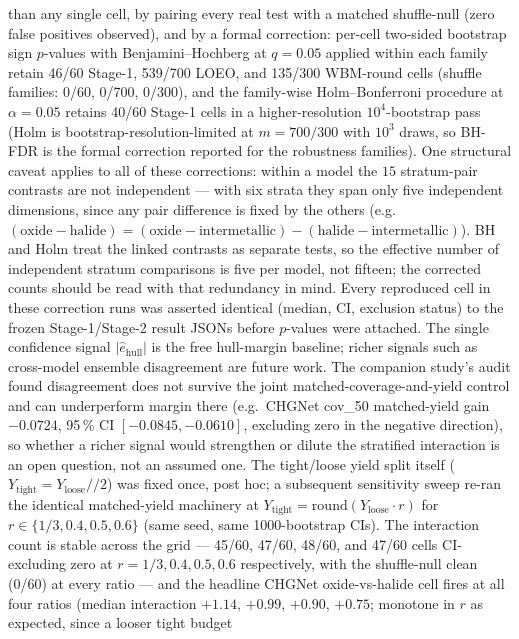 \documentclass[11pt]{article}
\begin{document}
than any single cell, by pairing every real test with a matched shuffle-null (zero false
positives observed), and by a formal correction: per-cell two-sided bootstrap sign
$p$-values with Benjamini--Hochberg at $q = 0.05$ applied within each family retain 46/60
Stage-1, 539/700 LOEO, and 135/300 WBM-round cells (shuffle families: 0/60, 0/700, 0/300),
and the family-wise Holm--Bonferroni procedure at $\alpha = 0.05$ retains 40/60 Stage-1
cells in a higher-resolution $10^4$-bootstrap pass (Holm is bootstrap-resolution-limited at
$m = 700/300$ with $10^3$ draws, so BH-FDR is the formal correction reported for the
robustness families). One structural caveat applies to all of these corrections: within a model
the $15$ stratum-pair contrasts are not independent --- with six strata they span only
five independent dimensions, since any pair difference is fixed by the others (e.g.\
$(\mathrm{oxide}-\mathrm{halide}) = (\mathrm{oxide}-\mathrm{intermetallic}) -
(\mathrm{halide}-\mathrm{intermetallic})$). BH and Holm treat the linked contrasts as separate
tests, so the effective number of independent stratum comparisons is five per model, not fifteen;
the corrected counts should be read with that redundancy in mind. Every reproduced cell in these correction runs was asserted
identical (median, CI, exclusion status) to the frozen Stage-1/Stage-2 result JSONs before
$p$-values were attached. The single confidence signal $|\hat{e}_{\mathrm{hull}}|$ is the free
hull-margin baseline; richer signals such as cross-model ensemble disagreement are future work.
The companion study's audit found disagreement does not survive the joint
matched-coverage-and-yield control and can underperform margin there (e.g.\ CHGNet
cov\_50 matched-yield gain $-0.0724$, 95\,\% CI $[-0.0845, -0.0610]$, excluding zero in the
negative direction), so whether a richer signal would strengthen or dilute the stratified
interaction is an open question, not an assumed one. The tight/loose yield split itself
($Y_{\mathrm{tight}} = Y_{\mathrm{loose}} // 2$) was fixed once, post hoc; a subsequent
sensitivity sweep re-ran the identical matched-yield machinery at
$Y_{\mathrm{tight}} = \mathrm{round}(Y_{\mathrm{loose}} \cdot r)$ for
$r \in \{1/3, 0.4, 0.5, 0.6\}$ (same seed, same 1000-bootstrap CIs). The interaction count is
stable across the grid --- 45/60, 47/60, 48/60, and 47/60 cells CI-excluding zero at
$r = 1/3, 0.4, 0.5, 0.6$ respectively, with the shuffle-null clean (0/60) at every ratio ---
and the headline CHGNet oxide-vs-halide cell fires at all four ratios (median interaction
$+1.14$, $+0.99$, $+0.90$, $+0.75$; monotone in $r$ as expected, since a looser tight budget
\end{document}
